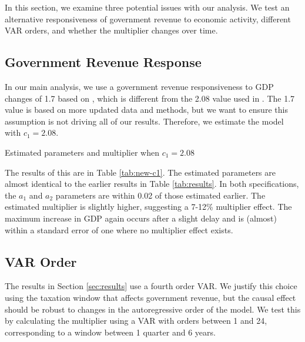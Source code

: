 In this section, we examine three potential issues with our analysis. We test an alternative responsiveness of government revenue to economic activity, different VAR orders, and whether the multiplier changes over time. 


\subsection{Government Revenue Response}

In our main analysis, we use a government revenue responsiveness to GDP changes of 1.7 based on \textcite{lutz2010fiscal}, which is different from the 2.08 value used in \textcite{blanchard2002empirical}. The 1.7 value is based on more updated data and methods, but we want to ensure this assumption is not driving all of our results. Therefore, we estimate the model with $c_1 = 2.08$.

\begin{table}[t]
    \centering
    \caption{Estimated parameters and multiplier when $c_1 = 2.08$}
    
    \label{tab:new-c1}
\end{table}

The results of this are in Table \ref{tab:new-c1}. The estimated parameters are almost identical to the earlier results in Table \ref{tab:results}. In both specifications, the $a_1$ and $a_2$ parameters are within 0.02 of those estimated earlier. The estimated multiplier is slightly higher, suggesting a 7-12\% multiplier effect.  The maximum increase in GDP again occurs after a slight delay and is (almost) within a standard error of one where no multiplier effect exists.


\subsection{VAR Order}

The results in Section \ref{sec:results} use a fourth order VAR. We justify this choice using the taxation window that affects government revenue, but the causal effect should be robust to changes in the autoregressive order of the model. We test this by calculating the multiplier using a VAR with orders between 1 and 24, corresponding to a window between 1 quarter and 6 years.

